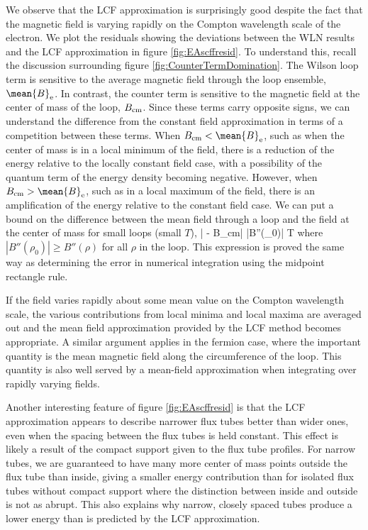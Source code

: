 We observe that the \ac{LCF} approximation is surprisingly good despite the 
fact that the magnetic field is varying rapidly on the Compton wavelength scale of the electron.
We plot the residuals showing the deviations between the \ac{WLN} results and the \ac{LCF}
approximation in figure \ref{fig:EAscffresid}. To understand this, recall the discussion 
surrounding figure \ref{fig:CounterTermDomination}. The Wilson loop term is sensitive to the 
average magnetic field through the loop ensemble, $\mean{B}_{\rm e}$. In contrast, the counter 
term is sensitive to the magnetic field at the center of mass of the loop, $B_{\rm cm}$. 
Since these terms carry opposite signs, we can understand the difference from the 
constant field approximation in terms of a competition between these terms. When 
$B_{\rm cm} < \mean{B}_{\rm e}$, such as when the center of mass is in a local minimum of the 
field, there is a reduction of the energy relative to the locally constant field case, with 
a possibility of the quantum term of the energy density becoming negative. 
However, when $B_{\rm cm} > \mean{B}_{\rm e}$, such as in a local maximum of the field, 
there is an amplification of the energy relative to the constant field case. We can put a 
bound on the difference between the mean field through a loop and the field at the 
center of mass for small loops (\ie small $T$),
\be
	| - B_{\rm cm}| \lesssim |B''(\rho_0)| T
\ee
where $|B''(\rho_0)| \ge B''(\rho)$ for all $\rho$ in the loop. This expression is proved the 
same way as determining the error in numerical integration using the midpoint rectangle 
rule.


If the field varies rapidly about some mean value 
on the Compton wavelength scale, the various contributions 
from local minima and local maxima are averaged out and the mean field approximation 
provided by the \ac{LCF} method becomes appropriate. A similar argument applies in the 
fermion case, where the important quantity is the mean magnetic field along the circumference 
of the loop. This quantity is also well served by a mean-field approximation when integrating 
over rapidly varying fields.

Another interesting feature of figure \ref{fig:EAscffresid} is that the \ac{LCF} 
approximation appears to describe narrower flux tubes better than wider ones, even when the 
spacing between the flux tubes is held constant. This effect is likely a result of the compact 
support given to the flux tube profiles. For narrow tubes, we are guaranteed to have many more 
center of mass points outside the flux tube than inside, giving a smaller energy contribution than 
for isolated flux tubes without compact support where the distinction between inside and outside is 
not as abrupt. This also explains why narrow, closely spaced tubes produce a lower energy than 
is predicted by the \ac{LCF} approximation.

